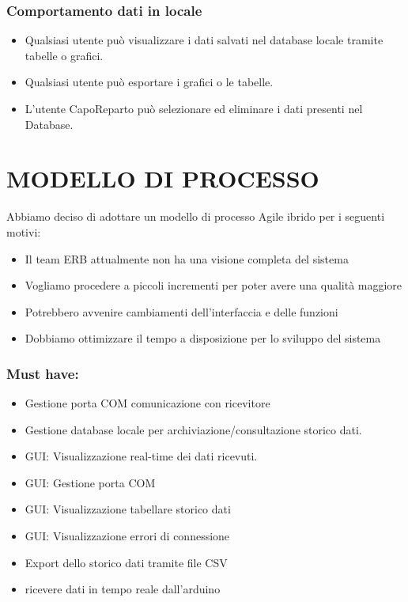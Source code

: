 \documentclass{report}
\begin{document}
\subsection{Comportamento dati in locale}
\begin{itemize}
\item Qualsiasi utente può visualizzare i dati salvati nel database locale tramite tabelle o grafici.
\item Qualsiasi utente può esportare i grafici o le tabelle.
\item L’utente CapoReparto può selezionare ed eliminare i dati presenti nel Database.
\end{itemize}





\chapter{MODELLO DI PROCESSO}
Abbiamo deciso di adottare un modello di processo Agile ibrido per i seguenti motivi:
\begin{itemize}
\item Il team ERB attualmente non ha una visione completa del sistema
\item Vogliamo procedere a piccoli incrementi per poter avere una qualità maggiore 
\item Potrebbero avvenire cambiamenti dell'interfaccia e delle funzioni
\item Dobbiamo ottimizzare il tempo a disposizione per lo sviluppo del sistema
\end{itemize}

\subsection*{Must have:}
\begin{itemize}
\item Gestione porta COM comunicazione con ricevitore
\item Gestione database locale per archiviazione/consultazione storico dati.
\item GUI: Visualizzazione real-time dei dati ricevuti.
\item GUI: Gestione porta COM 
\item GUI: Visualizzazione tabellare storico dati
\item GUI: Visualizzazione errori di connessione
\item Export dello storico dati tramite file CSV
\item ricevere dati in tempo reale dall'arduino
\end{itemize}
\end{document}
